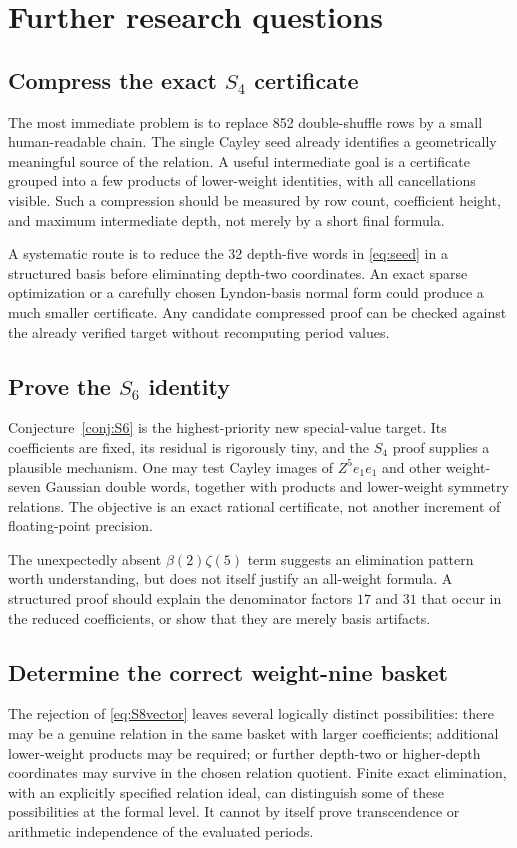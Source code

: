 \documentclass[11pt,letterpaper]{article}
\numberwithin{equation}{section}
\theoremstyle{definition}
\begin{document}
\section{Further research questions}
\label{sec:future}

\subsection{Compress the exact \texorpdfstring{$S_4$}{S4} certificate}
The most immediate problem is to replace 852 double-shuffle rows by a
small human-readable chain. The single Cayley seed already identifies
a geometrically meaningful source of the relation. A useful intermediate
goal is a certificate grouped into a few products of lower-weight
identities, with all cancellations visible. Such a compression should
be measured by row count, coefficient height, and maximum intermediate
depth, not merely by a short final formula.

A systematic route is to reduce the 32 depth-five words in
\eqref{eq:seed} in a structured basis before eliminating depth-two
coordinates. An exact sparse optimization or a carefully chosen
Lyndon-basis normal form could produce a much smaller certificate.
Any candidate compressed proof can be checked against the already
verified target without recomputing period values.

\subsection{Prove the \texorpdfstring{$S_6$}{S6} identity}
Conjecture~\ref{conj:S6} is the highest-priority new special-value target.
Its coefficients are fixed, its residual is rigorously tiny, and the
$S_4$ proof supplies a plausible mechanism. One may test Cayley images
of $Z^5e_1e_1$ and other weight-seven Gaussian double words, together
with products and lower-weight symmetry relations. The objective is
an exact rational certificate, not another increment of floating-point
precision.

The unexpectedly absent $\beta(2)\zeta(5)$ term suggests an elimination
pattern worth understanding, but does not itself justify an all-weight
formula. A structured proof should explain the denominator factors
$17$ and $31$ that occur in the reduced coefficients, or show that they
are merely basis artifacts.

\subsection{Determine the correct weight-nine basket}
The rejection of \eqref{eq:S8vector} leaves several logically distinct
possibilities: there may be a genuine relation in the same basket with
larger coefficients; additional lower-weight products may be required;
or further depth-two or higher-depth coordinates may survive in the
chosen relation quotient. Finite exact elimination, with an explicitly
specified relation ideal, can distinguish some of these possibilities
at the formal level. It cannot by itself prove transcendence or
arithmetic independence of the evaluated periods.
\end{document}
